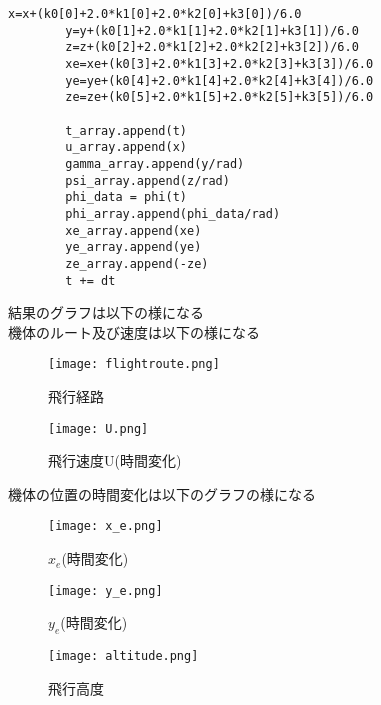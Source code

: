 \documentclass[15pt,uplatex,dvipdfmx]{jsarticle}
\begin{document}
\begin{lstlisting}[basicstyle=\ttfamily\footnotesize, frame=single]
        x=x+(k0[0]+2.0*k1[0]+2.0*k2[0]+k3[0])/6.0
        y=y+(k0[1]+2.0*k1[1]+2.0*k2[1]+k3[1])/6.0
        z=z+(k0[2]+2.0*k1[2]+2.0*k2[2]+k3[2])/6.0
        xe=xe+(k0[3]+2.0*k1[3]+2.0*k2[3]+k3[3])/6.0
        ye=ye+(k0[4]+2.0*k1[4]+2.0*k2[4]+k3[4])/6.0
        ze=ze+(k0[5]+2.0*k1[5]+2.0*k2[5]+k3[5])/6.0

        t_array.append(t)
        u_array.append(x)
        gamma_array.append(y/rad)
        psi_array.append(z/rad)
        phi_data = phi(t)
        phi_array.append(phi_data/rad)
        xe_array.append(xe)
        ye_array.append(ye)
        ze_array.append(-ze)
        t += dt

\end{lstlisting} \newpage

結果のグラフは以下の様になる \\
機体のルート及び速度は以下の様になる \\

\begin{figure}[H]
\begin{center}
  \texttt{[image: flightroute.png]}
\end{center}
  \caption{飛行経路}
\end{figure}

\begin{figure}[H]
\begin{center}
  \texttt{[image: U.png]}
\end{center}
  \caption{飛行速度U(時間変化)}
\end{figure} \newpage

機体の位置の時間変化は以下のグラフの様になる \\

\begin{figure}[H]
\begin{center}
  \texttt{[image: x\_e.png]}
\end{center}
  \caption{$x_e$(時間変化)}
\end{figure}

\begin{figure}[H]
\begin{center}
  \texttt{[image: y\_e.png]}
\end{center}
  \caption{$y_e$(時間変化)}
\end{figure}

\begin{figure}[H]
\begin{center}
  \texttt{[image: altitude.png]}
\end{center}
  \caption{飛行高度}
\end{figure} \newpage
\end{document}
